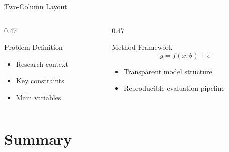 \documentclass{beamer}
\begin{document}
\begin{frame}{Two-Column Layout}
    \begin{columns}[T]
        \begin{column}{0.47\textwidth}
            \begin{block}{Problem Definition}
                \begin{itemize}
                    \item Research context
                    \item Key constraints
                    \item Main variables
                \end{itemize}
            \end{block}
        \end{column}
        \begin{column}{0.47\textwidth}
            \begin{exampleblock}{Method Framework}
                \begin{equation*}
                    y = f(x;\theta) + \epsilon
                \end{equation*}
                \begin{itemize}
                    \item Transparent model structure
                    \item Reproducible evaluation pipeline
                \end{itemize}
            \end{exampleblock}
        \end{column}
    \end{columns}
\end{frame}

\section{Summary}
\end{document}
